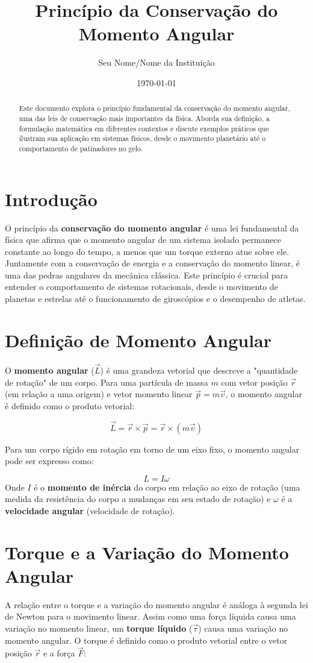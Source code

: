 \documentclass{article}
\title{Princípio da Conservação do Momento Angular}
\author{Seu Nome/Nome da Instituição}
\date{\today}
\begin{document}
\maketitle

\begin{abstract}
Este documento explora o princípio fundamental da conservação do momento angular, uma das leis de conservação mais importantes da física. Aborda sua definição, a formulação matemática em diferentes contextos e discute exemplos práticos que ilustram sua aplicação em sistemas físicos, desde o movimento planetário até o comportamento de patinadores no gelo.
\end{abstract}

\section{Introdução}
O princípio da \textbf{conservação do momento angular} é uma lei fundamental da física que afirma que o momento angular de um sistema isolado permanece constante ao longo do tempo, a menos que um torque externo atue sobre ele. Juntamente com a conservação de energia e a conservação do momento linear, é uma das pedras angulares da mecânica clássica. Este princípio é crucial para entender o comportamento de sistemas rotacionais, desde o movimento de planetas e estrelas até o funcionamento de giroscópios e o desempenho de atletas.

\section{Definição de Momento Angular}

O \textbf{momento angular} ($\vec{L}$) é uma grandeza vetorial que descreve a "quantidade de rotação" de um corpo. Para uma partícula de massa $m$ com vetor posição $\vec{r}$ (em relação a uma origem) e vetor momento linear $\vec{p} = m\vec{v}$, o momento angular é definido como o produto vetorial:

$$ \vec{L} = \vec{r} \times \vec{p} = \vec{r} \times (m\vec{v}) $$

Para um corpo rígido em rotação em torno de um eixo fixo, o momento angular pode ser expresso como:

$$ L = I\omega $$
Onde $I$ é o \textbf{momento de inércia} do corpo em relação ao eixo de rotação (uma medida da resistência do corpo a mudanças em seu estado de rotação) e $\omega$ é a \textbf{velocidade angular} (velocidade de rotação).

\section{Torque e a Variação do Momento Angular}
A relação entre o torque e a variação do momento angular é análoga à segunda lei de Newton para o movimento linear. Assim como uma força líquida causa uma variação no momento linear, um \textbf{torque líquido} ($\vec{\tau}$) causa uma variação no momento angular. O torque é definido como o produto vetorial entre o vetor posição $\vec{r}$ e a força $\vec{F}$:
\end{document}
